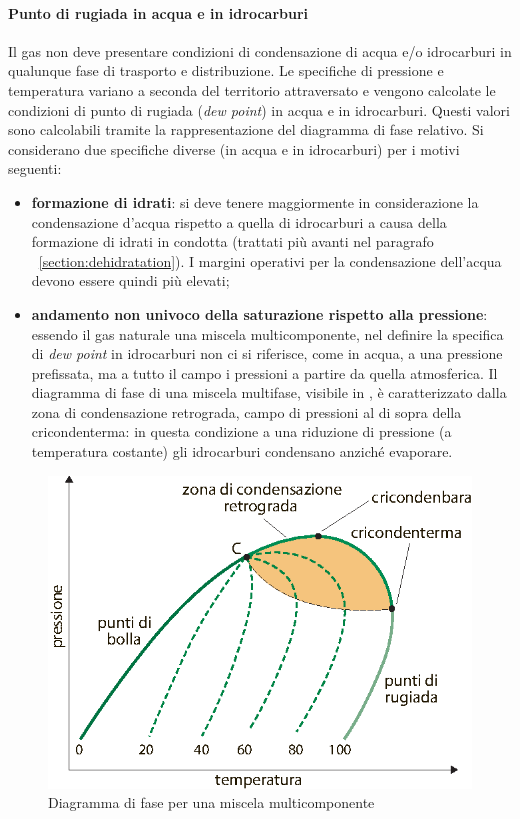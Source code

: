 \paragraph{Punto di rugiada in acqua e in idrocarburi}
Il gas non deve presentare condizioni di condensazione di acqua e/o idrocarburi in qualunque fase di trasporto e distribuzione. Le specifiche di pressione e temperatura variano a seconda del territorio attraversato e vengono calcolate le condizioni di punto di rugiada (\textit{dew point}) in acqua e in idrocarburi. Questi valori sono calcolabili tramite la rappresentazione del diagramma di fase relativo. Si considerano due specifiche diverse (in acqua e in idrocarburi) per i motivi seguenti:
\begin{itemize}
    \item \textbf{formazione di idrati}: si deve tenere maggiormente in considerazione la condensazione d'acqua rispetto a quella di idrocarburi a causa della formazione di idrati in condotta (trattati più avanti nel paragrafo ~\ref{section:dehidratation}). I margini operativi per la condensazione dell'acqua devono essere quindi più elevati;
    \item \textbf{andamento non univoco della saturazione rispetto alla pressione}: essendo il gas naturale una miscela multicomponente, nel definire la specifica di \textit{dew point} in idrocarburi non ci si riferisce, come in acqua, a una pressione prefissata, ma a tutto il campo i pressioni a partire da quella atmosferica. Il diagramma di fase di una miscela multifase, visibile in , è caratterizzato dalla zona di condensazione retrograda, campo di pressioni al di sopra della cricondenterma: in questa condizione a una riduzione di pressione (a temperatura costante) gli idrocarburi condensano anziché evaporare.
\end{itemize}

\begin{figure}[htbp]
    \centering
    \includegraphics[width=.6\textwidth]{fig/impianti/phasediagram.eps}
    \caption{Diagramma di fase per una miscela multicomponente \parencite{bianco2005impiantigas}}
    \label{fig:phasediagram}
\end{figure}

